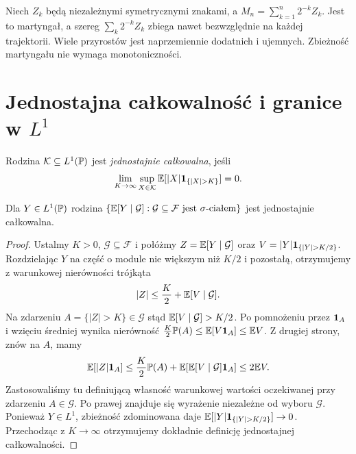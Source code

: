 \begin{przyklad}
Niech $Z_k$ będą niezależnymi symetrycznymi znakami,
a $M_n=\sum_{k=1}^n2^{-k}Z_k$.
Jest to martyngał, a szereg
$\sum_k2^{-k}Z_k$ zbiega nawet bezwzględnie
na każdej trajektorii. Wiele przyrostów jest
naprzemiennie dodatnich i ujemnych.
Zbieżność martyngału nie wymaga monotoniczności.
\end{przyklad}

\section{Jednostajna całkowalność i granice w \texorpdfstring{$L^1$}{L1}}

\begin{definicja}
Rodzina $\mathcal K\subseteq L^1(\mathbb{P})$ jest
\emph{jednostajnie całkowalna}, jeśli
\[
\lim_{K\to\infty}\sup_{X\in\mathcal K}
\E[|X|\ind{\{|X|>K\}}]=0.
\]
\end{definicja}

\begin{lemat}
Dla $Y\in L^1(\mathbb{P})$ rodzina
$\{\mathbb{E}[Y\mid\mathcal G]:\mathcal G\subseteq\mathcal F
\text{ jest }\sigma\text{-ciałem}\}$
jest jednostajnie całkowalna.
\end{lemat}
\begin{proof}
Ustalmy $K>0$, $\mathcal G\subseteq\mathcal F$
i połóżmy $Z=\mathbb{E}[Y\mid\mathcal G]$ oraz
$V=|Y|\ind{\{|Y|>K/2\}}$.
Rozdzielając $Y$ na część o module nie większym
niż $K/2$ i pozostałą, otrzymujemy z warunkowej
nierówności trójkąta
\[
|Z|\leq\frac K2+\mathbb{E}[V\mid\mathcal G].
\]
Na zdarzeniu $A=\{|Z|>K\}\in\mathcal G$
stąd $\mathbb{E}[V\mid\mathcal G]>K/2$.
Po pomnożeniu przez $\mathbf{1}_{A}$ i wzięciu średniej
wynika nierówność
$\frac K2\mathbb{P}(A)\leq\mathbb{E}[V\mathbf{1}_{A}]\leq\mathbb{E} V$.
Z drugiej strony, znów na $A$, mamy
\[
\mathbb{E}[|Z|\mathbf{1}_{A}]
\leq\frac K2\mathbb{P}(A)
 +\mathbb{E}[\mathbb{E}[V\mid\mathcal G]\mathbf{1}_{A}]
\leq2\mathbb{E} V.
\]
Zastosowaliśmy tu definiującą własność
warunkowej wartości oczekiwanej przy zdarzeniu
$A\in\mathcal G$. Po prawej znajduje się
wyrażenie niezależne od wyboru $\mathcal G$.
Ponieważ $Y\in L^1$, zbieżność zdominowana daje
$\E[|Y|\ind{\{|Y|>K/2\}}]\to0$.
Przechodząc z $K\to\infty$ otrzymujemy dokładnie
definicję jednostajnej całkowalności.
\end{proof}

